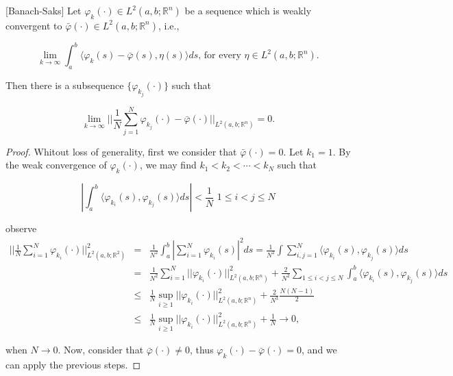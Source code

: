 \begin{theorem}\label{BST}[Banach-Saks]
Let $\varphi_k(\cdot)\in L^2(a,b;\mathbb{R}^n)$ be a sequence which is weakly convergent to $\bar{\varphi}(\cdot)\in L^2(a,b;\mathbb{R}^n)$, i.e.,

$$\lim_{k\rightarrow \infty} \int_{a}^{b} \langle\varphi_{k}(s)-\bar{\varphi}(s),\eta(s)\rangle ds,\,\mbox{for every}\,\, \eta\in L^2(a,b;\mathbb{R}^n).$$

Then there is a subsequence $\{\varphi_{k_j}(\cdot)\}$ such that

$$\lim_{k\rightarrow \infty}||\frac{1}{N}\sum_{j=1}^{N}\varphi_{k_j}(\cdot)-\bar{\varphi}(\cdot)||_{L^2(a,b;\mathbb{R}^n)}=0.$$
\end{theorem}
\begin{proof}
	Whitout loss of generality, first we consider that $\bar{\varphi}(\cdot)=0$. Let $k_1=1$. By the weak convergence of $\varphi_k(\cdot)$, we may find $k_1<k_2<\cdots <k_N$ such that
	
	$$|\int_{a}^{b}\langle\varphi_{k_i}(s),\varphi_{k_j}(s)\rangle ds|<\frac{1}{N}\,\, 1\leq i<j\leq N$$
	
	observe
	\begin{eqnarray*}
	||\frac{1}{N}\sum_{i=1}^{N}\varphi_{k_i}(\cdot)||^2_{L^2(a,b;\mathbb{R}^2)}&=&\frac{1}{N^2}\int_{a}^{b}|\sum_{i=1}^{N}\varphi_{k_i}(s)|^2 ds = \frac{1}{N^2}\int \sum_{i,j=1}^{N}\langle\varphi_{k_i}(s),\varphi_{k_j}(s)\rangle ds\\
	&=&\frac{1}{N^2}\sum_{i=1}^{N}||\varphi_{k_i}(\cdot)||^2_{L^2(a,b;\mathbb{R}^n)}+\frac{2}{N^2}\sum_{1\leq i<j\leq N}\int_{a}^{b}\langle\varphi_{k_i}(s),\varphi_{k_j}(s)\rangle ds\\
	&\leq& \frac{1}{N}\sup_{i\geq 1}||\varphi_{k_i}(\cdot)||^2_{L^2(a,b;\mathbb{R}^n)}+\frac{2}{N^3}\frac{N(N-1)}{2}\\
	&\leq& \frac{1}{N}\sup_{i\geq 1} ||\varphi_{k_i}(\cdot)||^2_{L^2(a,b;\mathbb{R}^n)}+\frac{1}{N}\rightarrow 0,
	\end{eqnarray*}
	
	when $N\rightarrow 0$. Now, consider that $\bar{\varphi}(\cdot)\neq 0$, thus $\varphi_{k}(\cdot)-\bar{\varphi}(\cdot)=0$, and we can apply the previous steps.
\end{proof}

